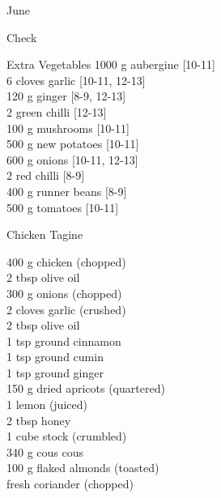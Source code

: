 \begin{menu}{June}
\begin{shoppinglist}{Check}
      \end{shoppinglist}%
      \begin{shoppinglist}{Extra Vegetables}
      1000 g aubergine {\scriptsize[10-11]}\\
      6 cloves garlic {\scriptsize[10-11, 12-13]}\\
      120 g ginger {\scriptsize[8-9, 12-13]}\\
      2  green chilli {\scriptsize[12-13]}\\
      100 g mushrooms {\scriptsize[10-11]}\\
      500 g new potatoes {\scriptsize[10-11]}\\
      600 g onions {\scriptsize[10-11, 12-13]}\\
      2  red chilli {\scriptsize[8-9]}\\
      400 g runner beans {\scriptsize[8-9]}\\
      500 g tomatoes {\scriptsize[10-11]}\\
      \end{shoppinglist}%
      \par\vfil %
    \vfil\clearpage
  
    \begin{recipe}{2}{Chicken Tagine}%
		\begin{ingredients}
		400 g chicken (chopped) \\
	2 tbsp olive oil  \\
	300 g onions (chopped) \\
	2 cloves garlic (crushed) \\
	2 tbsp olive oil  \\
	1 tsp ground cinnamon  \\
	1 tsp ground cumin  \\
	1 tsp ground ginger  \\
	150 g dried apricots (quartered) \\
	1  lemon (juiced) \\
	2 tbsp honey  \\
	1 cube stock (crumbled) \\
	340 g cous cous  \\
	100 g flaked almonds (toasted) \\
	  fresh coriander (chopped) \\
	
		\end{ingredients}
	

\end{recipe}
\end{menu}
